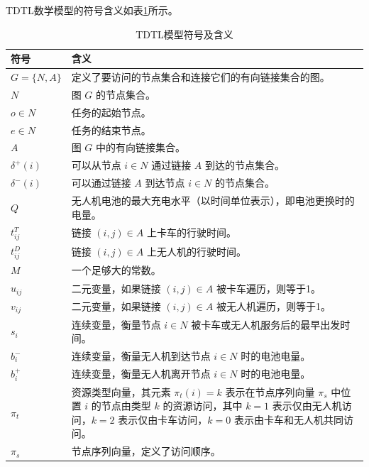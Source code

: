 TDTL数学模型的符号含义如表\ref{tab:tdtl-sign-meaning}所示。

\begin{table}[!htbp]
    \centering
    \caption{TDTL模型符号及含义}
    \label{tab:tdtl-sign-meaning}
    \begin{tabularx}{\textwidth}{lX}
        \toprule[1pt]
        符号 & 含义 \\
        \midrule[0.75pt]
        $G = \{N, A\}$ & 定义了要访问的节点集合和连接它们的有向链接集合的图。 \\
        $N$ & 图 $G$ 的节点集合。 \\
        $o \in N$ & 任务的起始节点。 \\
        $e \in N$ & 任务的结束节点。 \\
        $A$ & 图 $G$ 中的有向链接集合。 \\
        $\delta^{+}(i)$ & 可以从节点 $i \in N$ 通过链接 $A$ 到达的节点集合。 \\
        $\delta^{-}(i)$ & 可以通过链接 $A$ 到达节点 $i \in N$ 的节点集合。 \\
        $Q$ & 无人机电池的最大充电水平（以时间单位表示），即电池更换时的电量。 \\
        $t_{ij}^{T}$ & 链接 $(i, j) \in A$ 上卡车的行驶时间。 \\
        $t_{ij}^{D}$ & 链接 $(i, j) \in A$ 上无人机的行驶时间。 \\
        $M$ & 一个足够大的常数。 \\
        $u_{ij}$ & 二元变量，如果链接 $(i, j) \in A$ 被卡车遍历，则等于1。 \\
        $v_{ij}$ & 二元变量，如果链接 $(i, j) \in A$ 被无人机遍历，则等于1。 \\
        $s_{i}$ & 连续变量，衡量节点 $i \in N$ 被卡车或无人机服务后的最早出发时间。 \\
        $b_{i}^{-}$ & 连续变量，衡量无人机到达节点 $i \in N$ 时的电池电量。 \\
        $b_{i}^{+}$ & 连续变量，衡量无人机离开节点 $i \in N$ 时的电池电量。 \\
        $\pi_{t}$ & 资源类型向量，其元素 $\pi_{t}(i) = k$ 表示在节点序列向量 $\pi_{s}$ 中位置 $i$ 的节点由类型 $k$ 的资源访问，其中 $k=1$ 表示仅由无人机访问，$k=2$ 表示仅由卡车访问，$k=0$ 表示由卡车和无人机共同访问。 \\
        $\pi_{s}$ & 节点序列向量，定义了访问顺序。 \\
        \bottomrule[1pt]
    \end{tabularx}
\end{table}

